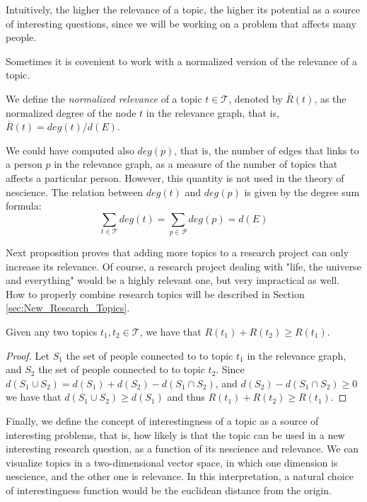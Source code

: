 Intuitively, the higher the relevance of a topic, the higher its potential as a source of interesting questions, since we will be working on a problem that affects many people.

Sometimes it is covenient to work with a normalized version of the relevance of a topic.

\begin{definition}
\label{def:normalized_relevance}
We define the \emph{normalized relevance} of a topic $t \in \mathcal{T}$, denoted by $\bar{R}(t)$, as the normalized degree of the node $t$ in the relevance graph, that is, $\bar{R}(t) = deg(t) / d(E)$.
\end{definition}

We could have computed also $deg(p)$, that is, the number of edges that links to a person $p$ in the relevance graph, as a measure of the number of topics that affects a particular person. However, this quantity is not used in the theory of nescience. The relation between $deg(t)$ and $deg(p)$ is given by the degree sum formula:
\[
\sum_{t \in \mathcal{T}} deg(t) = \sum_{p \in \mathcal{P}} deg(p) = d(E)
\]

Next proposition proves that adding more topics to a research project can only increase its relevance. Of course, a research project dealing with "life, the universe and everything" would be a highly relevant one, but very impractical as well. How to properly combine research topics will be described in Section \ref{sec:New_Research_Topics}.

\begin{proposition}
\label{prop:nondecreasing_relevance}
Given any two topics $t_{1}, t_{2} \in \mathcal{T}$, we have that $R(t_{1}) + R(t_{2}) \geq R(t_{1})$.
\end{proposition}
\begin{proof}
Let $S_{1}$ the set of people connected to to topic $t_{1}$ in the relevance graph, and  $S_{2}$ the set of people connected to to topic $t_{2}$. Since $d \left( S_{1} \cup S_{2} \right) = d(S_{1}) + d(S_{2}) - d(S_{1} \cap S_{2})$, and $d(S_{2}) - d(S_{1} \cap S_{2}) \geq 0$ we have that $d \left( S_{1} \cup S_{2} \right) \geq d(S_{1})$ and thus $R(t_{1}) + R(t_{2}) \geq R(t_{1})$.
\end{proof} 

Finally, we define the concept of interestingness of a topic as a source of interesting problems, that is, how likely is that the topic can be used in a new interesting research question, as a function of its nescience and relevance. We can visualize topics in a two-dimensional vector space, in which one dimension is nescience, and the other one is relevance. In this interpretation, a natural choice of interestingness function would be the euclidean distance from the origin.

